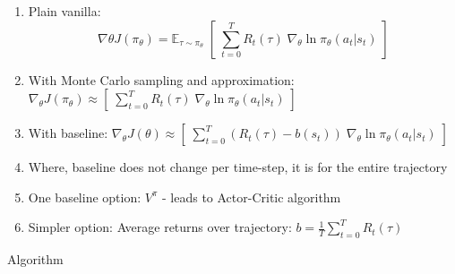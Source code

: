 \documentclass[]{article}
\begin{document}
\begin{enumerate}
	\item Plain vanilla: 
	\begin{equation}
		\nabla \theta J(\pi_\theta) = \mathbb{E}_{\tau \sim \pi_\theta} \; [ \; \sum_{t=0}^T R_t(\tau) \; \nabla_\theta \ln \pi_\theta(a_t \vert s_t) \;]
	\end{equation}
	\item With Monte Carlo sampling and approximation: $\nabla_\theta J(\pi_\theta) \approx [ \; \sum_{t=0}^T R_t(\tau) \; \nabla_\theta \ln \pi_\theta(a_t \vert s_t) \;]$
	\item With baseline: $\nabla_\theta J(\theta) \approx [ \; \sum_{t=0}^T (R_t(\tau) - b(s_t)) \; \nabla_\theta \ln \pi_\theta(a_t \vert s_t) \;]$
	\item Where, baseline does not change per time-step, it is for the entire trajectory
	\item One baseline option: $V^\pi$ - leads to Actor-Critic algorithm
	\item Simpler option: Average returns over trajectory: $b = \frac{1}{T}\sum_{t=0}^T R_t(\tau) $
\end{enumerate}

Algorithm
%
\end{document}
